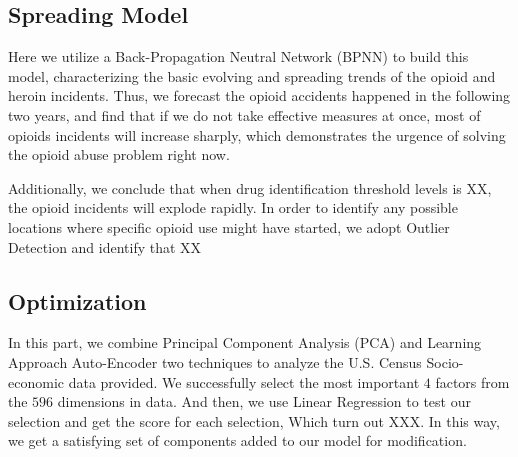 \documentclass{mcmthesis}
\begin{document}
\subsection*{Spreading Model }
Here we utilize a Back-Propagation Neutral Network (BPNN) to build this model, characterizing the basic evolving and spreading trends of the opioid and heroin incidents. Thus, we forecast the opioid accidents happened in the following two years, and find that if we do not take effective measures at once, most of opioids incidents will increase sharply, which demonstrates the urgence of solving the opioid abuse problem right now.

Additionally, we conclude that when drug identification threshold levels is XX, the opioid incidents will explode rapidly.
In order to identify any possible locations where specific opioid use 
might have started, we adopt Outlier Detection and identify that XX

\subsection*{Optimization}
 In this part, we combine Principal Component Analysis (PCA) and Learning Approach Auto-Encoder two techniques to analyze the U.S. Census Socio-economic data provided. We successfully select the most important $4$ factors from the $596$ dimensions in data. And then, we use Linear Regression to test our selection and get the score for each selection, Which turn out XXX. In this way, we get a satisfying set of components added to our model for modification. 
\end{document}
